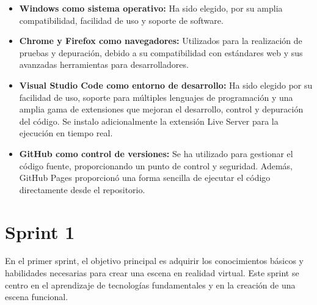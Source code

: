 \documentclass[a4paper, 12pt]{book}
\begin{document}
    \begin{itemize}
        \item \textbf{Windows como sistema operativo:} Ha sido elegido, por su amplia compatibilidad, facilidad de uso y soporte de software.   
        \item \textbf{Chrome y Firefox como navegadores:} Utilizados para la realización de pruebas y depuración, debido a su compatibilidad con estándares web y sus avanzadas herramientas para desarrolladores.   
        \item \textbf{Visual Studio Code como entorno de desarrollo:} Ha sido elegido por su facilidad de uso, soporte para múltiples lenguajes de programación y una amplia gama de extensiones que mejoran el desarrollo, control y depuración del código. Se instalo adicionalmente la extensión Live Server para la ejecución en tiempo real. 
        \item \textbf{GitHub como control de versiones:} Se ha utilizado para gestionar el código fuente, proporcionando un punto de control y seguridad. Además, GitHub Pages proporcionó una forma sencilla de ejecutar el código directamente desde el repositorio.   
    \end{itemize}


    
    
    \newpage
    \section{Sprint 1}

    En el primer sprint, el objetivo principal es adquirir los conocimientos básicos y habilidades necesarias para crear una escena en realidad virtual. Este sprint se centro en el aprendizaje de tecnologías fundamentales y en la creación de una escena funcional.
\end{document}
